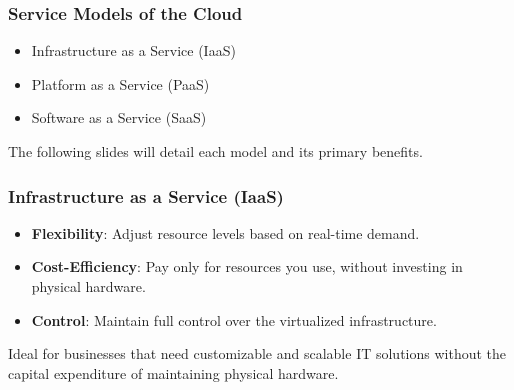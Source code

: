 \documentclass{beamer}
\begin{document}
\begin{frame}
    \frametitle{Service Models of the Cloud}
    \vspace{10pt}
    \begin{itemize}
        \item{Infrastructure as a Service (IaaS)}
        \item{Platform as a Service (PaaS)}
        \item{Software as a Service (SaaS)}
    \end{itemize}
    \vspace{10pt}
    The following slides will detail each model and its primary benefits.
\end{frame}

\begin{frame}
    \frametitle{Infrastructure as a Service (IaaS)}
    \vspace{10pt}
    \begin{itemize}
        \item\textbf{Flexibility}: Adjust resource levels based on real{-}time demand.
        \item\textbf{Cost{-}Efficiency}: Pay only for resources you use, without investing in physical hardware.
        \item\textbf{Control}: Maintain full control over the virtualized infrastructure.
    \end{itemize}
    \vspace{10pt}
    Ideal for businesses that need customizable and scalable IT solutions without the capital expenditure of maintaining physical hardware.
\end{frame}
\end{document}
